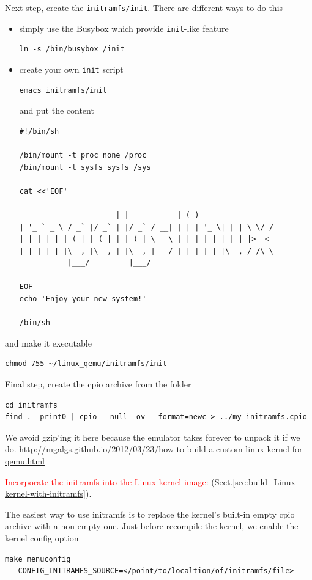 Next step, create the \verb!initramfs/init!. There are different ways to do this
\begin{itemize}
  \item simply use the Busybox which provide \verb!init!-like feature
  
\begin{verbatim}
ln -s /bin/busybox /init
\end{verbatim}

  \item create your own \verb!init! script
  
\begin{verbatim}
emacs initramfs/init
\end{verbatim}
and put the content
\begin{verbatim}
#!/bin/sh

/bin/mount -t proc none /proc
/bin/mount -t sysfs sysfs /sys

cat <<'EOF'
                       _             _ _                  
 _ __ ___   __ _  __ _| | __ _ ___  | (_)_ __  _   ___  __
| '_ ` _ \ / _` |/ _` | |/ _` / __| | | | '_ \| | | \ \/ /
| | | | | | (_| | (_| | | (_| \__ \ | | | | | | |_| |>  < 
|_| |_| |_|\__, |\__,_|_|\__, |___/ |_|_|_| |_|\__,_/_/\_\
           |___/         |___/                            

EOF
echo 'Enjoy your new system!'

/bin/sh
\end{verbatim}
\end{itemize}
and make it executable
\begin{verbatim}
chmod 755 ~/linux_qemu/initramfs/init
\end{verbatim}

Final step, create the cpio archive from the folder
\begin{verbatim}
cd initramfs
find . -print0 | cpio --null -ov --format=newc > ../my-initramfs.cpio
\end{verbatim}
We avoid gzip'ing it here because the emulator takes forever to unpack it if we
do.
\url{http://mgalgs.github.io/2012/03/23/how-to-build-a-custom-linux-kernel-for-qemu.html}

\textcolor{red}{Incorporate the initramfs into the Linux kernel image}:
(Sect.\ref{sec:build_Linux-kernel-with-initramfs}).

The easiest way to use initramfs is to replace the kernel's built-in empty cpio
archive with a non-empty one. Just before recompile the kernel, we enable the
kernel config option
\begin{verbatim}
make menuconfig
   CONFIG_INITRAMFS_SOURCE=</point/to/localtion/of/initramfs/file>
\end{verbatim} 

